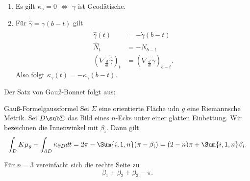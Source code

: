 \begin{bemerkungen}
\begin{enumerate}
\item Es gilt $\kappa_\gamma = 0$ $\iff$ $\gamma$ ist Geodätische.
\item Für $\dot{\hat{\gamma}} = \gamma(b-t)$ gilt
\begin{align}
\dot{\hat{\gamma}} (t) &= - \dot{\gamma} (b-t)\\
\hat{N}_t &= -N_{b-t}\\
\left( \nabla_\frac{d}{dt} \dot{\hat{\gamma}}\right)_t &= \left( \nabla_\frac{d}{dt} \dot{\gamma} \right)_{b-t}.
\end{align}
Also folgt $\kappa_{\hat{\gamma}}(t)=-\kappa_\gamma(b-t)$.
\end{enumerate}
\end{bemerkungen}

Der Satz von Gauß-Bonnet folgt aus:
\begin{theorem}{Gauß-Formel}{gaussformel}
Sei $\Sigma$ eine orientierte Fläche udn $g$ eine Riemannsche Metrik. Sei $D\sub \Sigma$ das Bild eines $n$-Ecks unter einer glatten Einbettung. Wir bezeichnen die Innenwinkel mit $\beta_i$. Dann gilt
\begin{equation}
\int_D K \mu_g + \int_{\partial D} \kappa_{\partial D} dt = 2 \pi- \Sum{i,1,n} (\pi - \beta_i) = (2-n) \pi + \Sum{i,1,n} \beta_i.
\end{equation}
\end{theorem}

\begin{bemerkung}
Für $n=3$ vereinfacht sich die rechte Seite zu 
\begin{equation}
\beta_1 + \beta_2 + \beta_3 - \pi.
\end{equation}
\end{bemerkung}


